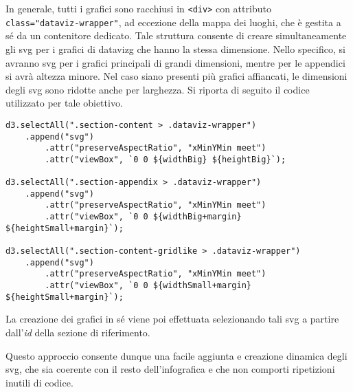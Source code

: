 In generale, tutti i grafici sono racchiusi in \texttt{<div>} con attributo \\ \texttt{class="dataviz-wrapper"}, ad eccezione della mappa dei luoghi, che è gestita a sé da un contenitore dedicato. 
Tale struttura consente di creare simultaneamente gli \gls{svg} per i grafici di \gls{datavizg} che hanno la stessa dimensione. 
Nello specifico, si avranno \gls{svg} per i grafici principali di grandi dimensioni, mentre per le appendici si avrà altezza minore. Nel caso siano presenti più grafici affiancati, le dimensioni degli \gls{svg} sono ridotte 
anche per larghezza.
Si riporta di seguito il codice utilizzato per tale obiettivo.
\begin{lstlisting}[style=htmlcssjs]
d3.selectAll(".section-content > .dataviz-wrapper")
    .append("svg")
        .attr("preserveAspectRatio", "xMinYMin meet")
        .attr("viewBox", `0 0 ${widthBig} ${heightBig}`);

d3.selectAll(".section-appendix > .dataviz-wrapper")
    .append("svg")
        .attr("preserveAspectRatio", "xMinYMin meet")
        .attr("viewBox", `0 0 ${widthBig+margin} ${heightSmall+margin}`);

d3.selectAll(".section-content-gridlike > .dataviz-wrapper")
    .append("svg")
        .attr("preserveAspectRatio", "xMinYMin meet")
        .attr("viewBox", `0 0 ${widthSmall+margin} ${heightSmall+margin}`);
\end{lstlisting}
La creazione dei grafici in sé viene poi effettuata selezionando tali \gls{svg} a partire dall'\emph{id} della sezione di riferimento. 

Questo approccio consente dunque una facile aggiunta e creazione dinamica degli \gls{svg}, che sia coerente con il resto dell'infografica
e che non comporti ripetizioni inutili di codice.

